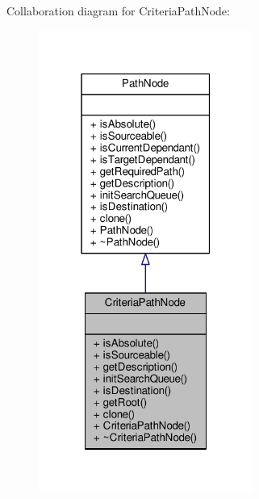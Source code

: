 Collaboration diagram for Criteria\+Path\+Node\+:
\nopagebreak
\begin{figure}[H]
\begin{center}
\leavevmode
\includegraphics[width=199pt]{d8/d3b/classCriteriaPathNode__coll__graph}
\end{center}
\end{figure}
